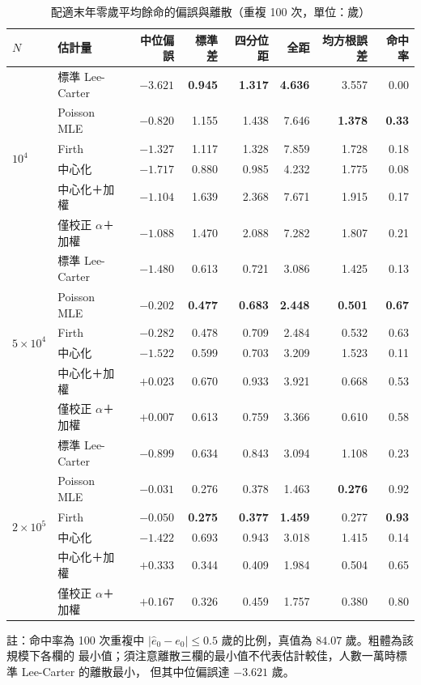 \documentclass[UTF8, fontset=macnew, a4paper, 12pt]{ctexart}
\begin{document}
\begin{table}[H]
\centering
\caption{配適末年零歲平均餘命的偏誤與離散（重複 100 次，單位：歲）}
\footnotesize
\renewcommand{\arraystretch}{1.1}
\begin{tabular}{llrrrrrr}
\toprule
$N$ & 估計量 & 中位偏誤 & 標準差 & 四分位距 & 全距 & 均方根誤差 & 命中率\\
\midrule
\multirow{6}{*}{$10^4$}
 & 標準 Lee-Carter             & $-3.621$ & \textbf{0.945} & \textbf{1.317} & \textbf{4.636} & 3.557 & 0.00\\
 & Poisson MLE          & \textbf{$-0.820$} & 1.155 & 1.438 & 7.646 & \textbf{1.378} & \textbf{0.33}\\
 & Firth               & $-1.327$ & 1.117 & 1.328 & 7.859 & 1.728 & 0.18\\
 & 中心化              & $-1.717$ & 0.880 & 0.985 & 4.232 & 1.775 & 0.08\\
 & 中心化＋加權        & $-1.104$ & 1.639 & 2.368 & 7.671 & 1.915 & 0.17\\
 & 僅校正 $\alpha$＋加權 & $-1.088$ & 1.470 & 2.088 & 7.282 & 1.807 & 0.21\\
\midrule
\multirow{6}{*}{$5\times10^4$}
 & 標準 Lee-Carter             & $-1.480$ & 0.613 & 0.721 & 3.086 & 1.425 & 0.13\\
 & Poisson MLE          & $-0.202$ & \textbf{0.477} & \textbf{0.683} & \textbf{2.448} & \textbf{0.501} & \textbf{0.67}\\
 & Firth               & $-0.282$ & 0.478 & 0.709 & 2.484 & 0.532 & 0.63\\
 & 中心化              & $-1.522$ & 0.599 & 0.703 & 3.209 & 1.523 & 0.11\\
 & 中心化＋加權        & $+0.023$ & 0.670 & 0.933 & 3.921 & 0.668 & 0.53\\
 & 僅校正 $\alpha$＋加權 & \textbf{$+0.007$} & 0.613 & 0.759 & 3.366 & 0.610 & 0.58\\
\midrule
\multirow{6}{*}{$2\times10^5$}
 & 標準 Lee-Carter             & $-0.899$ & 0.634 & 0.843 & 3.094 & 1.108 & 0.23\\
 & Poisson MLE          & \textbf{$-0.031$} & 0.276 & 0.378 & 1.463 & \textbf{0.276} & 0.92\\
 & Firth               & $-0.050$ & \textbf{0.275} & \textbf{0.377} & \textbf{1.459} & 0.277 & \textbf{0.93}\\
 & 中心化              & $-1.422$ & 0.693 & 0.943 & 3.018 & 1.415 & 0.14\\
 & 中心化＋加權        & $+0.333$ & 0.344 & 0.409 & 1.984 & 0.504 & 0.65\\
 & 僅校正 $\alpha$＋加權 & $+0.167$ & 0.326 & 0.459 & 1.757 & 0.380 & 0.80\\
\bottomrule
\end{tabular}

\vspace{2pt}
\parbox{0.92\textwidth}{\footnotesize 註：命中率為 100 次重複中
$|\hat e_0-e_0|\le0.5$ 歲的比例，真值為 $84.07$ 歲。粗體為該規模下各欄的
最小值；須注意離散三欄的最小值不代表估計較佳，人數一萬時標準 Lee-Carter 的離散最小，
但其中位偏誤達 $-3.621$ 歲。}
\label{tab:e0var}
\end{table}
\end{document}
